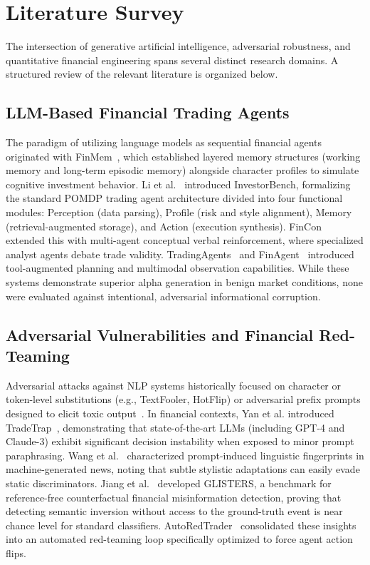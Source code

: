 \documentclass[11pt,a4paper]{article}
\begin{document}
\section{Literature Survey}
\label{sec:literature_survey}

The intersection of generative artificial intelligence, adversarial robustness, and quantitative financial engineering spans several distinct research domains. A structured review of the relevant literature is organized below.

\subsection{LLM-Based Financial Trading Agents}
The paradigm of utilizing language models as sequential financial agents originated with FinMem~\cite{yu2025finmem}, which established layered memory structures (working memory and long-term episodic memory) alongside character profiles to simulate cognitive investment behavior. Li et al.~\cite{li2025investorbench} introduced InvestorBench, formalizing the standard POMDP trading agent architecture divided into four functional modules: Perception (data parsing), Profile (risk and style alignment), Memory (retrieval-augmented storage), and Action (execution synthesis). FinCon~\cite{yu2024fincon} extended this with multi-agent conceptual verbal reinforcement, where specialized analyst agents debate trade validity. TradingAgents~\cite{xiao2025tradingagents} and FinAgent~\cite{zhang2024finagent} introduced tool-augmented planning and multimodal observation capabilities. While these systems demonstrate superior alpha generation in benign market conditions, none were evaluated against intentional, adversarial informational corruption.

\subsection{Adversarial Vulnerabilities and Financial Red-Teaming}
Adversarial attacks against NLP systems historically focused on character or token-level substitutions (e.g., TextFooler, HotFlip) or adversarial prefix prompts designed to elicit toxic output~\cite{jiang2024artprompt, zhou2025autoredteamer}. In financial contexts, Yan et al. introduced TradeTrap~\cite{yan2025tradetrap}, demonstrating that state-of-the-art LLMs (including GPT-4 and Claude-3) exhibit significant decision instability when exposed to minor prompt paraphrasing. Wang et al.~\cite{wang2026life} characterized prompt-induced linguistic fingerprints in machine-generated news, noting that subtle stylistic adaptations can easily evade static discriminators. Jiang et al.~\cite{jiang2026glisters} developed GLISTERS, a benchmark for reference-free counterfactual financial misinformation detection, proving that detecting semantic inversion without access to the ground-truth event is near chance level for standard classifiers. AutoRedTrader~\cite{liu2026autoredtrader} consolidated these insights into an automated red-teaming loop specifically optimized to force agent action flips.
\end{document}
